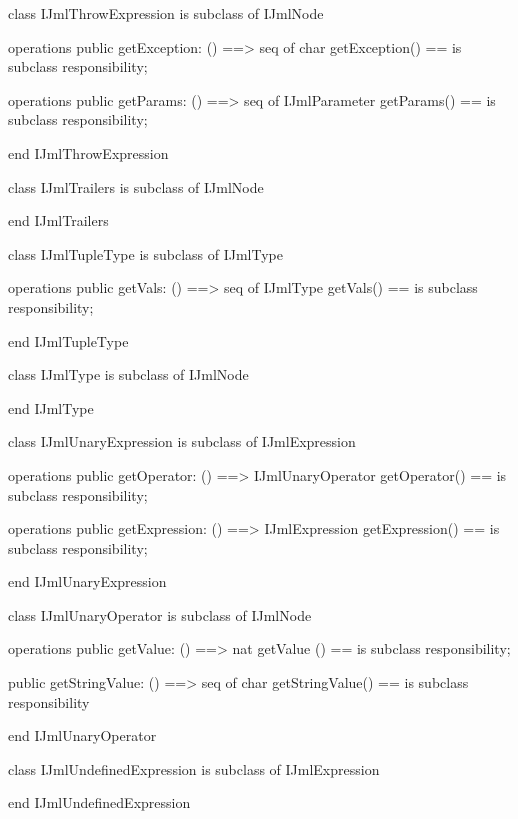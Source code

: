 \begin{vdm_al}
class IJmlThrowExpression
 is subclass of IJmlNode

operations
  public getException: () ==> seq of char
  getException() == is subclass responsibility;

operations
  public getParams: () ==> seq of IJmlParameter
  getParams() == is subclass responsibility;

end IJmlThrowExpression
\end{vdm_al}

\begin{vdm_al}
class IJmlTrailers
 is subclass of IJmlNode

end IJmlTrailers
\end{vdm_al}

\begin{vdm_al}
class IJmlTupleType
 is subclass of IJmlType

operations
  public getVals: () ==> seq of IJmlType
  getVals() == is subclass responsibility;

end IJmlTupleType
\end{vdm_al}

\begin{vdm_al}
class IJmlType
 is subclass of IJmlNode

end IJmlType
\end{vdm_al}

\begin{vdm_al}
class IJmlUnaryExpression
 is subclass of IJmlExpression

operations
  public getOperator: () ==> IJmlUnaryOperator
  getOperator() == is subclass responsibility;

operations
  public getExpression: () ==> IJmlExpression
  getExpression() == is subclass responsibility;

end IJmlUnaryExpression
\end{vdm_al}

\begin{vdm_al}
class IJmlUnaryOperator
 is subclass of IJmlNode

operations
  public getValue: () ==> nat
  getValue () == is subclass responsibility;

  public getStringValue: () ==> seq of char
  getStringValue() == is subclass responsibility

end IJmlUnaryOperator
\end{vdm_al}

\begin{vdm_al}
class IJmlUndefinedExpression
 is subclass of IJmlExpression

end IJmlUndefinedExpression
\end{vdm_al}


